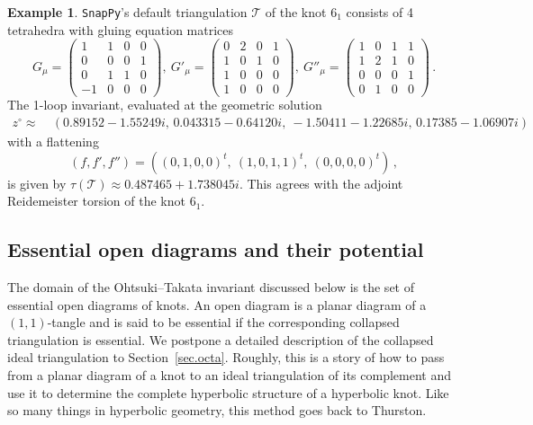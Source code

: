 \documentclass[12pt,reqno]{amsart}
\theoremstyle{definition}
\newtheorem{example}[theorem]{Example}
\def\calT{\mathcal T}
\begin{document}
\begin{example}
\texttt{SnapPy}'s default triangulation $\calT$ of the knot $6_1$ consists of
4 tetrahedra with gluing equation matrices
\begin{equation*}
G_\mu = 
\begin{pmatrix}
1 & 1 & 0 & 0  \\
0 & 0 & 0 & 1  \\
0 & 1 & 1 & 0  \\
-1 & 0 & 0 & 0 
\end{pmatrix}, \
G'_\mu =
\begin{pmatrix}
0 & 2 & 0 & 1  \\
1 & 0 & 1 & 0  \\
1 & 0 & 0 & 0  \\
1 & 0 & 0 & 0   
\end{pmatrix}, \
G''_\mu = 
\begin{pmatrix}
1 & 0 & 1 & 1  \\
1 & 2 & 1 & 0  \\
0 & 0 & 0 & 1  \\
0 & 1 & 0 & 0  
\end{pmatrix}
\, .
\end{equation*}
The 1-loop invariant, evaluated at the geometric solution
\begin{align*}
z^\circ \approx \ & (0.89152 -1.55249i ,\, 0.043315 - 0.64120i, 
\ -1.50411-1.22685i, \, 0.17385 -1.06907i)
\end{align*}
with a flattening 
\begin{equation*}
(f,f',f'')= ( (0,1,0,0)^t, \ (1,0,1,1)^t, \ (0,0,0,0)^t) \,,
\end{equation*}
is given by $\tau(\calT) \approx  0.487465 + 1.738045 i$. This agrees with
the adjoint Reidemeister torsion of the knot $6_1$.
\end{example}

\subsection{Essential open diagrams and their potential}
\label{sub.PD}

The domain of the Ohtsuki--Takata invariant discussed below is the set of
essential open diagrams of knots. An open diagram is a planar diagram 
of a $(1,1)$-tangle and is said to be essential if the corresponding 
collapsed triangulation is essential. We postpone a detailed description of
the collapsed ideal triangulation to Section~\ref{sec.octa}. Roughly, this is
a story of how to pass from a planar diagram of a knot to an ideal triangulation of
its complement and use it to determine the complete hyperbolic structure of a
hyperbolic knot. Like so many things in hyperbolic geometry, this method goes
back to Thurston.
\end{document}
